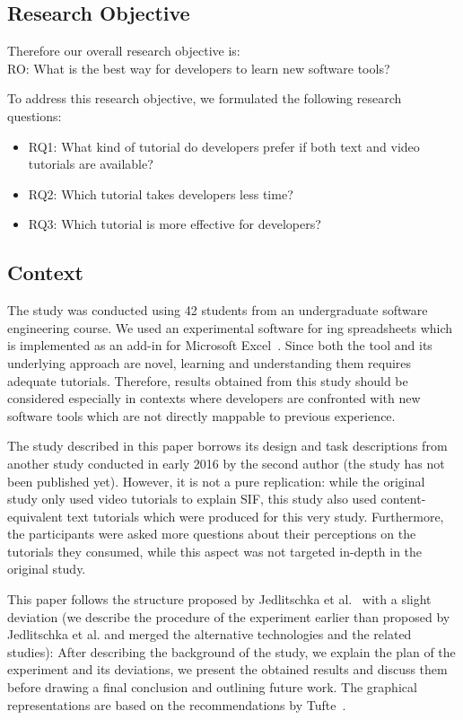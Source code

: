 \subsection{Research Objective}

Therefore our overall research objective is:\\
RO: What is the best way for developers to learn new software tools?

To address this research objective, we formulated the following research questions:

\begin{itemize}
	\item RQ1: What kind of tutorial do developers prefer if both text and video tutorials are available?
	\item RQ2: Which tutorial takes developers less time?
	\item RQ3: Which tutorial is more effective for developers?
\end{itemize}




\subsection{Context}



The study was conducted using 42 students from an undergraduate software engineering course. We used an experimental software for ing spreadsheets which is implemented as an add-in for Microsoft Excel~\cite{excel}. Since both the tool and its underlying approach are novel, learning and understanding them requires adequate tutorials. Therefore, results obtained from this study should be considered especially in contexts where developers are confronted with new software tools which are not directly mappable to previous experience. 

The study described in this paper borrows its design and task descriptions from another study conducted in early 2016 by the second author (the study has not been published yet). However, it is not a pure replication: while the original study only used video tutorials to explain SIF, this study also used content-equivalent text tutorials which were produced for this very study. Furthermore, the participants were asked more questions about their perceptions on the tutorials they consumed, while this aspect was not targeted in-depth in the original study.


This paper follows the structure proposed by Jedlitschka et al.~\cite{jedlitschka} with a slight deviation (we describe the procedure of the experiment earlier than proposed by Jedlitschka et al. and merged the alternative technologies and the related studies): After describing the background of the study, we explain the plan of the experiment and its deviations, we present the obtained results and discuss them before drawing a final conclusion and outlining future work. The graphical representations are based on the recommendations by Tufte~\cite{tufte}. 



